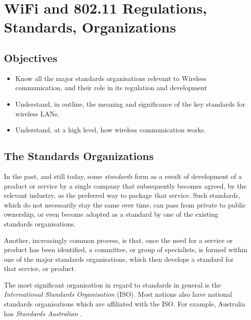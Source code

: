 \chapter{WiFi and 802.11 Regulations, Standards, Organizations}\label{wifi}

\minitoc 


\section*{Objectives}
\begin{itemize}

\item Know all the major standards organisations relevant to Wireless communication, and
	their role in its regulation and development

\item Understand, in outline, the meaning and significance of the key standards
	for wireless LANs.

\item Understand, at a high level, how wireless communication works.

\end{itemize}

\section{The Standards Organizations}

In the past, and still today, some {\em standards} form as a result of
development of a product or service by a single company that subsequently
becomes agreed, by the relevant industry, as the preferred way to package
that service. Such standards, which do not necessarily stay the same
over time, can pass from private to public ownership, or even
become adopted as a standard by one of the existing standards organisations.

Another, increasingly common process, is that, once the need for a service
or product has been identified, a committee, or group of specialists,
is formed within one of the major standards organisations, which then
develops a standard for that service, or product.

The most significant organisation in regard to standards in general
is the {\em International Standards Organisation} (ISO).
Most nations also have national standards organisations which are
affiliated with the ISO. For example, Australia has {\em Standards Australian}
\cite{SA}. 

